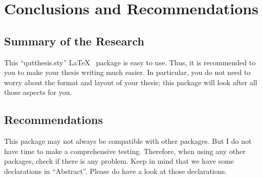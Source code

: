 
\chapter[Conclusions and Recommendations]{Conclusions and Recommendations}
\label{cha:cha6Conclusions}

\section{Summary of the Research}  

This ``qutthesis.sty'' \LaTeX~ package is easy to use. Thus, it is recommended to you to make your thesis writing much easier. In particular, you do not need to worry about the format and layout of your thesis; this package will look after all those aspects for you. 


\section{Recommendations} 

This package may not always be compatible with other packages. But I do not have time to make a comprehensive testing. Therefore, when using any other packages, check if there is any problem. Keep in mind that we have some declarations in ``Abstract''. Please do have a look at those declarations. 



